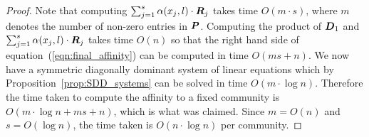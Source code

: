 \begin{proof}
Note that computing $\sum_{j = 1}^{s} \alpha (x_j, l) \cdot \boldsymbol{R}_j$ takes time $O(m \cdot s)$, where $m$ 
denotes the number of non-zero entries in $\boldsymbol{P}$. Computing the product of 
$\boldsymbol{D}_1$ and $\sum_{j = 1}^{s} \alpha (x_j, l) \cdot \boldsymbol{R}_j$ takes time $O(n)$ so that 
the right hand side of equation~(\ref{eqn:final_affinity}) can be computed in time $O(ms + n)$.
We now have a symmetric diagonally dominant system of linear equations which by 
Proposition~\ref{prop:SDD_systems} can be solved in time $O(m \cdot \log n)$. Therefore 
the time taken to compute the affinity to a fixed community is $O(m \cdot \log n + ms + n)$,
which is what was claimed. Since $m = O(n)$ and $s = O(\log n)$, the time taken 
is $O(n \cdot \log n)$ per community.  
%
\end{proof}

